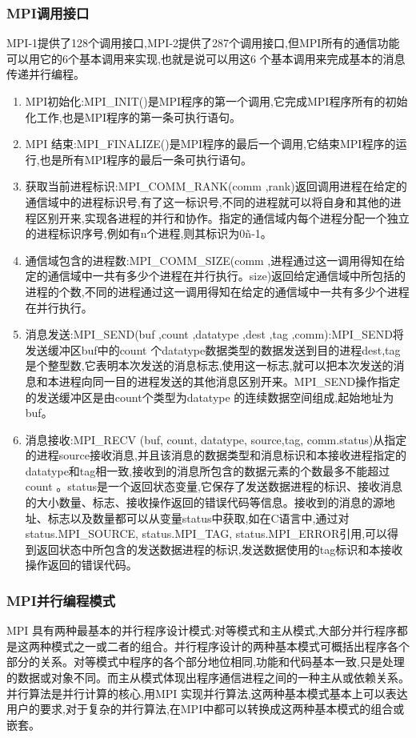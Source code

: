 \documentclass[paper=a4]{ctexart} %
\numberwithin{equation}{section} %
\numberwithin{figure}{section} %
\numberwithin{table}{section} %
\begin{document}
\subsubsection{MPI调用接口}
MPI-1提供了128个调用接口,MPI-2提供了287个调用接口,但MPI所有的通信功能可以用它的6个基本调用来实现,也就是说可以用这6 个基本调用来完成基本的消息传递并行编程。
\begin{enumerate}
\item MPI初始化:MPI\_INIT()是MPI程序的第一个调用,它完成MPI程序所有的初始化工作,也是MPI程序的第一条可执行语句。
\item MPI 结束:MPI\_FINALIZE()是MPI程序的最后一个调用,它结束MPI程序的运行,也是所有MPI程序的最后一条可执行语句。
\item 获取当前进程标识:MPI\_COMM\_RANK(comm ,rank)返回调用进程在给定的通信域中的进程标识号,有了这一标识号,不同的进程就可以将自身和其他的进程区别开来,实现各进程的并行和协作。指定的通信域内每个进程分配一个独立的进程标识序号,例如有n个进程,则其标识为0\~n-1。
\item 通信域包含的进程数:MPI\_COMM\_SIZE(comm ,进程通过这一调用得知在给定的通信域中一共有多少个进程在并行执行。size)返回给定通信域中所包括的进程的个数,不同的进程通过这一调用得知在给定的通信域中一共有多少个进程在并行执行。
\item 消息发送:MPI\_SEND(buf ,count ,datatype ,dest ,tag ,comm):MPI\_SEND将发送缓冲区buf中的count 个datatype数据类型的数据发送到目的进程dest,tag是个整型数,它表明本次发送的消息标志,使用这一标志,就可以把本次发送的消息和本进程向同一目的进程发送的其他消息区别开来。MPI\_SEND操作指定的发送缓冲区是由count个类型为datatype 的连续数据空间组成,起始地址为buf。
\item 消息接收:MPI\_RECV (buf, count, datatype, source,tag, comm.status)从指定的进程source接收消息,并且该消息的数据类型和消息标识和本接收进程指定的datatype和tag相一致,接收到的消息所包含的数据元素的个数最多不能超过count 。status是一个返回状态变量,它保存了发送数据进程的标识、接收消息的大小数量、标志、接收操作返回的错误代码等信息。接收到的消息的源地址、标志以及数量都可以从变量status中获取,如在C语言中,通过对status.MPI\_SOURCE, status.MPI\_TAG, status.MPI\_ERROR引用,可以得到返回状态中所包含的发送数据进程的标识,发送数据使用的tag标识和本接收操作返回的错误代码。
\end{enumerate}

\subsubsection{MPI并行编程模式}
MPI 具有两种最基本的并行程序设计模式:对等模式和主从模式,大部分并行程序都是这两种模式之一或二者的组合。并行程序设计的两种基本模式可概括出程序各个部分的关系。对等模式中程序的各个部分地位相同,功能和代码基本一致,只是处理的数据或对象不同。而主从模式体现出程序通信进程之间的一种主从或依赖关系。并行算法是并行计算的核心,用MPI 实现并行算法,这两种基本模式基本上可以表达用户的要求,对于复杂的并行算法,在MPI中都可以转换成这两种基本模式的组合或嵌套。
\end{document}
